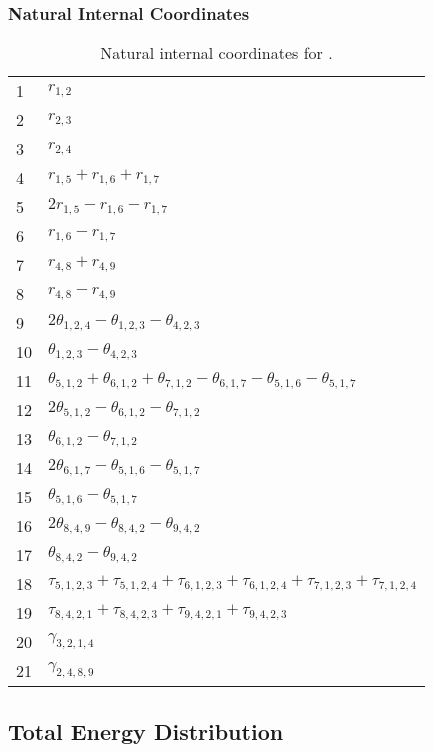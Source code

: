 \documentclass[10pt,oneside]{article}
\begin{document}
\begin{table}[h!]
\subsubsection*{Natural Internal Coordinates}
\centering
\caption{Natural internal coordinates for .}
\small
\begin{tabular}{ll}
\toprule
  1   & $r_{1,2}$ \\
  2   & $r_{2,3}$ \\
  3   & $r_{2,4}$ \\
  4   & $r_{1,5} + r_{1,6} + r_{1,7}$ \\
  5   & $2r_{1,5} - r_{1,6} - r_{1,7}$ \\
  6   & $r_{1,6} - r_{1,7}$ \\
  7   & $r_{4,8} + r_{4,9}$ \\
  8   & $r_{4,8} - r_{4,9}$ \\
  9   & $2\theta_{1,2,4} - \theta_{1,2,3} - \theta_{4,2,3}$ \\
  10  & $\theta_{1,2,3} - \theta_{4,2,3}$ \\
  11  & $\theta_{5,1,2} + \theta_{6,1,2} + \theta_{7,1,2} - \theta_{6,1,7} - \theta_{5,1,6} - \theta_{5,1,7}$ \\
  12  & $2\theta_{5,1,2} - \theta_{6,1,2} - \theta_{7,1,2}$ \\
  13  & $\theta_{6,1,2} - \theta_{7,1,2}$ \\
  14  & $2\theta_{6,1,7} - \theta_{5,1,6} - \theta_{5,1,7}$ \\
  15  & $\theta_{5,1,6} - \theta_{5,1,7}$ \\
  16  & $2\theta_{8,4,9} - \theta_{8,4,2} - \theta_{9,4,2}$ \\
  17  & $\theta_{8,4,2} - \theta_{9,4,2}$ \\
  18  & $\tau_{5,1,2,3} + \tau_{5,1,2,4} + \tau_{6,1,2,3} + \tau_{6,1,2,4} + \tau_{7,1,2,3} + \tau_{7,1,2,4}$ \\
  19  & $\tau_{8,4,2,1} + \tau_{8,4,2,3} + \tau_{9,4,2,1} + \tau_{9,4,2,3}$ \\
  20  & $\gamma_{3,2,1,4}$ \\
  21  & $\gamma_{2,4,8,9}$ \\
\bottomrule
\end{tabular}
\end{table}

\begin{table}
\subsection*{Total Energy Distribution}
\centering\end{table}
\end{document}
